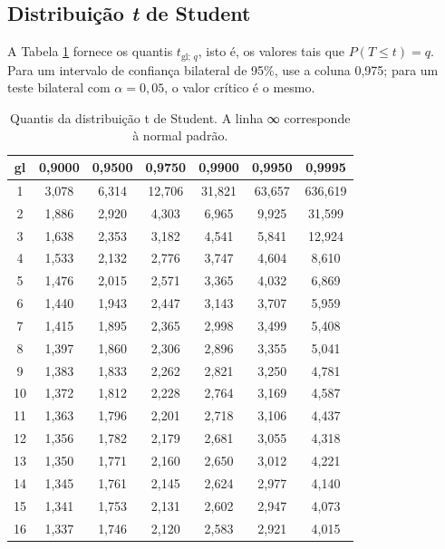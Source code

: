 \documentclass[
]{book}
\begin{document}
\subsection{\texorpdfstring{Distribuição \emph{t} de Student}{Distribuição t de Student}}\label{distribuiuxe7uxe3o-t-de-student-1}

A Tabela \ref{tab:rec-t} fornece os quantis \(t_{\text{gl};\,q}\), isto é, os valores tais que \(P(T \le t) = q\). Para um intervalo de confiança bilateral de 95\%, use a coluna 0,975; para um teste bilateral com \(\alpha = 0{,}05\), o valor crítico é o mesmo.

\begin{table}

\caption{\label{tab:rec-t}Quantis da distribuição t de Student. A linha ∞ corresponde à normal padrão.}
\centering
\begin{tabular}[t]{c|c|c|c|c|c|c}
\hline
gl & 0,9000 & 0,9500 & 0,9750 & 0,9900 & 0,9950 & 0,9995\\
\hline
1 & 3,078 & 6,314 & 12,706 & 31,821 & 63,657 & 636,619\\
\hline
2 & 1,886 & 2,920 & 4,303 & 6,965 & 9,925 & 31,599\\
\hline
3 & 1,638 & 2,353 & 3,182 & 4,541 & 5,841 & 12,924\\
\hline
4 & 1,533 & 2,132 & 2,776 & 3,747 & 4,604 & 8,610\\
\hline
5 & 1,476 & 2,015 & 2,571 & 3,365 & 4,032 & 6,869\\
\hline
6 & 1,440 & 1,943 & 2,447 & 3,143 & 3,707 & 5,959\\
\hline
7 & 1,415 & 1,895 & 2,365 & 2,998 & 3,499 & 5,408\\
\hline
8 & 1,397 & 1,860 & 2,306 & 2,896 & 3,355 & 5,041\\
\hline
9 & 1,383 & 1,833 & 2,262 & 2,821 & 3,250 & 4,781\\
\hline
10 & 1,372 & 1,812 & 2,228 & 2,764 & 3,169 & 4,587\\
\hline
11 & 1,363 & 1,796 & 2,201 & 2,718 & 3,106 & 4,437\\
\hline
12 & 1,356 & 1,782 & 2,179 & 2,681 & 3,055 & 4,318\\
\hline
13 & 1,350 & 1,771 & 2,160 & 2,650 & 3,012 & 4,221\\
\hline
14 & 1,345 & 1,761 & 2,145 & 2,624 & 2,977 & 4,140\\
\hline
15 & 1,341 & 1,753 & 2,131 & 2,602 & 2,947 & 4,073\\
\hline
16 & 1,337 & 1,746 & 2,120 & 2,583 & 2,921 & 4,015\\

\end{tabular}
\end{table}
\end{document}
